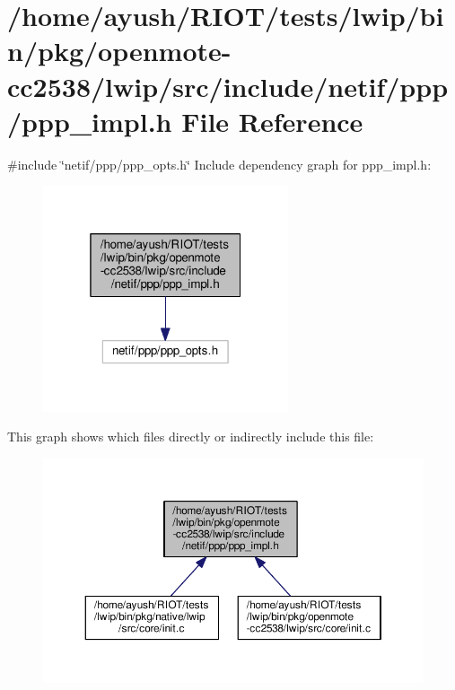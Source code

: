 \hypertarget{openmote-cc2538_2lwip_2src_2include_2netif_2ppp_2ppp__impl_8h}{}\section{/home/ayush/\+R\+I\+O\+T/tests/lwip/bin/pkg/openmote-\/cc2538/lwip/src/include/netif/ppp/ppp\+\_\+impl.h File Reference}
\label{openmote-cc2538_2lwip_2src_2include_2netif_2ppp_2ppp__impl_8h}
{\ttfamily \#include \char`\"{}netif/ppp/ppp\+\_\+opts.\+h\char`\"{}}\newline
Include dependency graph for ppp\+\_\+impl.\+h\+:
\nopagebreak
\begin{figure}[H]
\begin{center}
\leavevmode
\includegraphics[width=205pt]{openmote-cc2538_2lwip_2src_2include_2netif_2ppp_2ppp__impl_8h__incl}
\end{center}
\end{figure}
This graph shows which files directly or indirectly include this file\+:
\nopagebreak
\begin{figure}[H]
\begin{center}
\leavevmode
\includegraphics[width=350pt]{openmote-cc2538_2lwip_2src_2include_2netif_2ppp_2ppp__impl_8h__dep__incl}
\end{center}
\end{figure}
